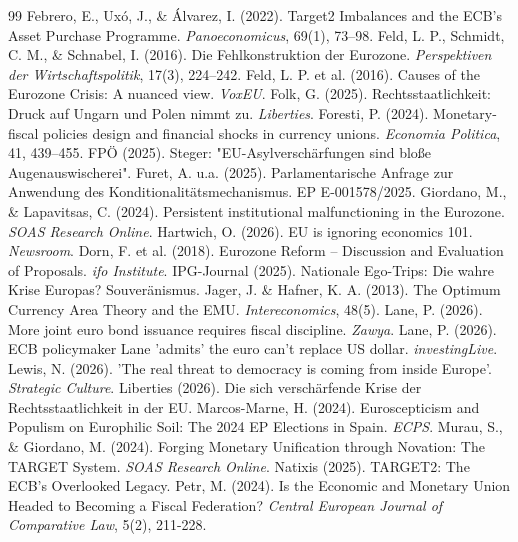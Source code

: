 \documentclass[12pt,a4paper]{article}
\begin{document}
\begin{thebibliography}{99}
		 Febrero, E., Uxó, J., \& Álvarez, I. (2022). Target2 Imbalances and the ECB’s Asset Purchase Programme. \textit{Panoeconomicus}, 69(1), 73–98.
		 Feld, L. P., Schmidt, C. M., \& Schnabel, I. (2016). Die Fehlkonstruktion der Eurozone. \textit{Perspektiven der Wirtschaftspolitik}, 17(3), 224–242.
		 Feld, L. P. et al. (2016). Causes of the Eurozone Crisis: A nuanced view. \textit{VoxEU}.
		 Folk, G. (2025). Rechtsstaatlichkeit: Druck auf Ungarn und Polen nimmt zu. \textit{Liberties}.
		 Foresti, P. (2024). Monetary-fiscal policies design and financial shocks in currency unions. \textit{Economia Politica}, 41, 439–455.
		 FPÖ (2025). Steger: "EU-Asylverschärfungen sind bloße Augenauswischerei".
		 Furet, A. u.a. (2025). Parlamentarische Anfrage zur Anwendung des Konditionalitätsmechanismus. EP E-001578/2025.
		 Giordano, M., \& Lapavitsas, C. (2024). Persistent institutional malfunctioning in the Eurozone. \textit{SOAS Research Online}.
		 Hartwich, O. (2026). EU is ignoring economics 101. \textit{Newsroom}.
		 Dorn, F. et al. (2018). Eurozone Reform – Discussion and Evaluation of Proposals. \textit{ifo Institute}.
		 IPG-Journal (2025). Nationale Ego-Trips: Die wahre Krise Europas? Souveränismus.
		 Jager, J. \& Hafner, K. A. (2013). The Optimum Currency Area Theory and the EMU. \textit{Intereconomics}, 48(5).
		 Lane, P. (2026). More joint euro bond issuance requires fiscal discipline. \textit{Zawya}.
		 Lane, P. (2026). ECB policymaker Lane 'admits' the euro can't replace US dollar. \textit{investingLive}.
		 Lewis, N. (2026). 'The real threat to democracy is coming from inside Europe'. \textit{Strategic Culture}.
		 Liberties (2026). Die sich verschärfende Krise der Rechtsstaatlichkeit in der EU.
		 Marcos-Marne, H. (2024). Euroscepticism and Populism on Europhilic Soil: The 2024 EP Elections in Spain. \textit{ECPS}.
		 Murau, S., \& Giordano, M. (2024). Forging Monetary Unification through Novation: The TARGET System. \textit{SOAS Research Online}.
		 Natixis (2025). TARGET2: The ECB's Overlooked Legacy.
		 Petr, M. (2024). Is the Economic and Monetary Union Headed to Becoming a Fiscal Federation? \textit{Central European Journal of Comparative Law}, 5(2), 211-228.

\end{thebibliography}
\end{document}
